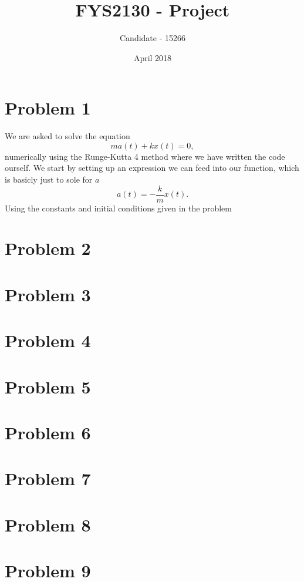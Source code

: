 \documentclass{article}
\title{FYS2130 - Project}
\author{Candidate - 15266}
\date{April 2018}
\begin{document}
\maketitle

\section*{Problem 1}
We are asked to solve the equation
\begin{equation}
ma(t) + kx(t) = 0,
\end{equation}
numerically using the Runge-Kutta 4 method where we have written the code ourself. We start by setting up an expression we can feed into our function, which is basicly just to sole for $a$
\begin{equation}
a(t) = -\frac{k}{m}x(t).
\end{equation}
Using the constants and initial conditions given in the problem


\section*{Problem 2}

\section*{Problem 3}

\section*{Problem 4}

\section*{Problem 5}

\section*{Problem 6}

\section*{Problem 7}

\section*{Problem 8}

\section*{Problem 9}
\end{document}
